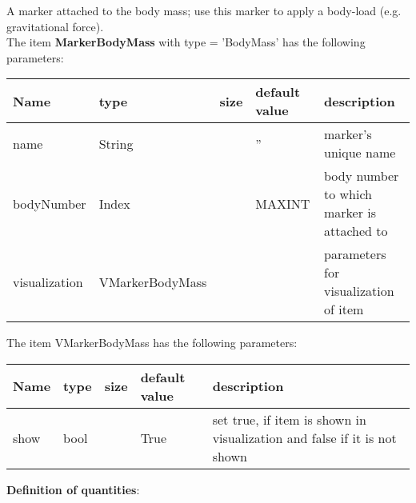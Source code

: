 \newpage

A marker attached to the body mass; use this marker to apply a body-load (e.g. gravitational force).
 \\\vspace{12pt} \noindent The item {\bf MarkerBodyMass} with type = 'BodyMass' has the following parameters:\vspace{-1cm}\\ 
\begin{center}
  \footnotesize
  \begin{longtable}{| p{4.5cm} | p{2.5cm} | p{0.5cm} | p{2.5cm} | p{6cm} |}
    \hline
    \bf Name & \bf type & \bf size & \bf default value & \bf description \\ \hline
    name &     String &      &     '' &     marker's unique name\\ \hline
    bodyNumber &     Index &      &     MAXINT &     body number to which marker is attached to\\ \hline
    visualization & VMarkerBodyMass & & & parameters for visualization of item \\ \hline
	  \end{longtable}
	\end{center}
The item VMarkerBodyMass has the following parameters:\vspace{-1cm}\\ 
\begin{center}
  \footnotesize
  \begin{longtable}{| p{4.5cm} | p{2.5cm} | p{0.5cm} | p{2.5cm} | p{6cm} |}
    \hline
    \bf Name & \bf type & \bf size & \bf default value & \bf description \\ \hline
    show &     bool &      &     True &     set true, if item is shown in visualization and false if it is not shown\\ \hline
	  \end{longtable}
	\end{center}
{\bf Definition of quantities}:\\
\newpage

